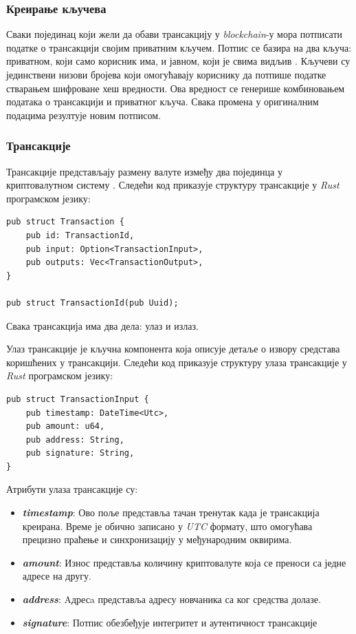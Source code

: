 \documentclass[12pt, a4paper]{article}
\begin{document}
\subsubsection{Креирање кључева}
Сваки појединац који жели да обави трансакцију у \textit{blockchain}-у мора потписати податке о трансакцији својим приватним кључем. Потпис се базира на два кључа: приватном, који само корисник има, и јавном, који је свима видљив \cite{11}. Кључеви су јединствени низови бројева који омогућавају кориснику да потпише податке стварањем шифроване хеш вредности. Ова вредност се генерише комбиновањем података о трансакцији и приватног кључа. Свака промена у оригиналним подацима резултује новим потписом.

\subsubsection{Трансакције}
Трансакције представљају размену валуте између два појединца у криптовалутном систему \cite{12}.  Следећи код приказује структуру трансакције у \textit{Rust} програмском језику:

\begin{verbatim}
pub struct Transaction {
    pub id: TransactionId,
    pub input: Option<TransactionInput>,
    pub outputs: Vec<TransactionOutput>,
}

pub struct TransactionId(pub Uuid);

\end{verbatim}

Свака трансакција има два дела: улаз и излаз. 

Улаз трансакције је кључна компонента која описује детаље о извору средстава коришћених у трансакцији. Следећи код приказује структуру улаза трансакције у \textit{Rust} програмском језику:
\begin{verbatim}
pub struct TransactionInput {
    pub timestamp: DateTime<Utc>,
    pub amount: u64,
    pub address: String,
    pub signature: String,
}
\end{verbatim}

Атрибути улаза трансакције су:
\begin{itemize}
    \item \textbf{\textit{timestamp}}: Ово поље представља тачан тренутак када је трансакција креирана. Време је обично записано у \textit{UTC} формату, што омогућава прецизно праћење и синхронизацију у међународним оквирима.
    \item \textbf{\textit{amount}}: Износ представља количину криптовалуте која се преноси са једне адресе на другу. 
    \item \textbf{\textit{address}}: Aдресa представља адресу новчаника са ког средства долазе.
    \item \textbf{\textit{signature}}: Потпис обезбеђује интегритет и аутентичност трансакције
\end{itemize}
\end{document}
